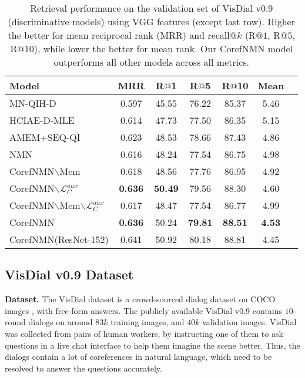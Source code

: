 \documentclass[runningheads]{llncs}
\makeatletter
\def\adl@drawiv#1#2#3{\hskip.5\tabcolsep
        \xleaders#3{#2.5\@tempdimb #1{1}#2.5\@tempdimb}#2\z@ plus1fil minus1fil\relax
        \hskip.5\tabcolsep}
\newcommand{\cdashlinelr}[1]{\noalign{\vskip\aboverulesep
           \global\let\@dashdrawstore\adl@draw
           \global\let\adl@draw\adl@drawiv}
  \cdashline{#1}
  \noalign{\global\let\adl@draw\@dashdrawstore
           \vskip\belowrulesep}}
\newcommand{\nmn}{CorefNMN\xspace}
\makeatother
\begin{document}
\begin{table}[t]
	\centering
	\setlength{\tabcolsep}{6pt}
    \begin{tabular}{lcccccc}
	\toprule
	\textbf{Model} & \textbf{MRR} & \textbf{R$@$1} & \textbf{R$@$5}
    				& \textbf{R$@$10} & \textbf{Mean} \\\midrule
MN-QIH-D \cite{visdial} 
    	& 0.597 & 45.55 & 76.22 & 85.37 & 5.46\\
    HCIAE-D-MLE \cite{lu_nips16} 
    	& 0.614 & 47.73 & 77.50 & 86.35 & 5.15\\
    AMEM+SEQ-QI \cite{paul2017visual} 
    	& 0.623 & 48.53 & 78.66 & 87.43 & 4.86\\
    NMN\cite{hu2017learning}
    	& 0.616 & 48.24 & 77.54 & 86.75 & 4.98\\
    \cdashlinelr{1-6}
	\nmn{}$\backslash$Mem
    	& 0.618 & 48.56 & 77.76 & 86.95 & 4.92 \\
	\nmn{}$\backslash\mathcal{L}_C^{aux}$
    	& \textbf{0.636} & \textbf{50.49} & 79.56 & 88.30 & 4.60\\
    \nmn{}$\backslash$Mem$\backslash\mathcal{L}_C^{aux}$
    	& 0.617 & 48.47 & 77.54 & 86.77 & 4.99 \\
    \nmn
    	& \textbf{0.636} & 50.24 & \textbf{79.81} & \textbf{88.51} & \textbf{4.53}\\
\midrule
    \nmn (ResNet-152)
   	 	& 0.641 & 50.92 & 80.18 & 88.81 & 4.45\\
	\bottomrule
	\end{tabular}
\caption{
    Retrieval performance on the validation set of VisDial v0.9 \cite{visdial} 
    (discriminative models) using VGG 	
    \cite{simonyan_iclr15} features (except last row).
    Higher the better for mean reciprocal rank (MRR) and recall$@k$ 
    (R$@1$, R$@5$, R$@10$), while lower the better for mean rank.
    Our \nmn model outperforms all other models across all metrics.}
    \label{tab:visdial_disc_result_table}
\end{table} 
\subsection{VisDial v0.9 Dataset}


\noindent
\textbf{Dataset.}
The VisDial dataset \cite{visdial} is a crowd-sourced dialog dataset on COCO
images \cite{mscoco}, with free-form answers.
The publicly available VisDial v0.9 contains $10$-round dialogs on around $83k$ training images, and $40k$ 
validation images.
VisDial was collected from pairs of human workers, by instructing one of them 
to ask questions in a live chat interface to help them imagine the scene 
better.
Thus, the dialogs contain a lot of coreferences in natural language, which need 
to be resolved to answer the questions accurately.
\end{document}
